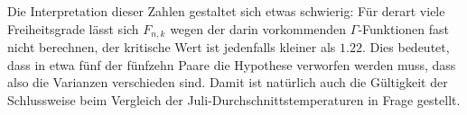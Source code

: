 Die Interpretation dieser Zahlen gestaltet sich etwas schwierig: Für derart
viele Freiheitsgrade lässt sich $F_{n,k}$ wegen der darin
vorkommenden $\Gamma$-Funktionen fast nicht berechnen, der kritische Wert
ist jedenfalls kleiner als $1.22$.
Dies bedeutet, dass in etwa fünf der
fünfzehn Paare die Hypothese verworfen werden muss, dass also die Varianzen
verschieden sind.
Damit ist natürlich auch die Gültigkeit der Schlussweise
beim Vergleich der Juli-Durchschnittstemperaturen in Frage gestellt.
